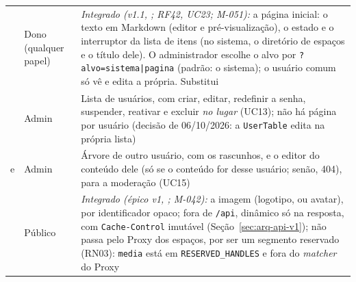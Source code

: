 \begin{table}[htb]
\begin{tabularx}{\linewidth}{@{}L{4.3cm}L{2.3cm}Y@{}}
 & Dono (qualquer papel) & \emph{Integrado (v1.1, ; RF42, UC23; M-051):} a página inicial: o texto em Markdown (editor e pré-visualização), o estado e o interruptor da lista de itens (no sistema, o diretório de espaços e o título dele). O administrador escolhe o alvo por \texttt{?alvo=sistema|pagina} (padrão: o sistema); o usuário comum só vê e edita a própria. Substitui \\
\addlinespace
{} & Admin & Lista de usuários, com criar, editar, redefinir a senha, suspender, reativar e excluir \emph{no lugar} (UC13); não há página por usuário (decisão de 06/10/2026: a \texttt{UserTable} edita na própria lista)\\
\addlinespace
{} e  & Admin & Árvore de outro usuário, com os rascunhos, e o editor do conteúdo dele (só se o conteúdo for desse usuário; senão, 404), para a moderação (UC15)\\
\addlinespace
{} & Público & \emph{Integrado (épico v1, ; M-042):} a imagem (logotipo,  ou avatar), por identificador opaco;  fora de \texttt{/api}, dinâmico só na resposta, com \texttt{Cache-Control} imutável (Seção~\ref{sec:arq-api-v1}); não passa pelo Proxy dos espaços, por ser um segmento reservado (RN03): \texttt{media} está em \texttt{RESERVED\_HANDLES} e fora do \emph{matcher} do Proxy\\
\bottomrule
\end{tabularx}
\end{table}

